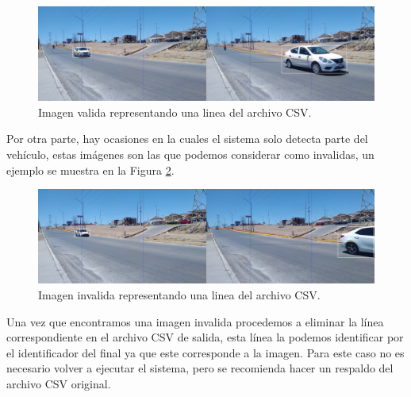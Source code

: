 \begin{figure}[H]
    \centering
    \includegraphics[width=1\textwidth]{Metodologia/imgs/Valido.jpg}
    \caption{Imagen valida representando una linea del archivo CSV.}
    \label{fig:ImagenValida}
\end{figure}

Por otra parte, hay ocasiones en la cuales el sistema solo detecta parte del vehículo, estas imágenes son las que podemos considerar como invalidas, un ejemplo se muestra en la Figura \ref{fig:ImagenInvalida}.

\begin{figure}[H]
    \centering
    \includegraphics[width=1\textwidth]{Metodologia/imgs/Invalido.jpg}
    \caption{Imagen invalida representando una linea del archivo CSV.}
    \label{fig:ImagenInvalida}
\end{figure}

Una vez que encontramos una imagen invalida procedemos a eliminar la línea correspondiente en el archivo CSV de salida, esta línea la podemos identificar por el identificador del final ya que este corresponde a la imagen. Para este caso no es necesario volver a ejecutar el sistema, pero se recomienda hacer un respaldo del archivo CSV original.
